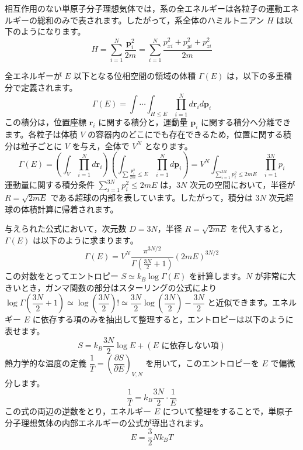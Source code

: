 \solutionheading
\begin{solutionparts}

相互作用のない単原子分子理想気体では，系の全エネルギーは各粒子の運動エネルギーの総和のみで表されます。したがって，系全体のハミルトニアン $H$ は以下のようになります。
\begin{equation*}
H = \sum_{i=1}^N \frac{\boldsymbol{p}_i^2}{2m} = \sum_{i=1}^N \frac{p_{xi}^2 + p_{yi}^2 + p_{zi}^2}{2m}
\end{equation*}

全エネルギーが $E$ 以下となる位相空間の領域の体積 $\Gamma(E)$ は，以下の多重積分で定義されます。
\begin{equation*}
\Gamma(E) = \int \cdots \int_{H \le E} \prod_{i=1}^N d\boldsymbol{r}_i d\boldsymbol{p}_i
\end{equation*}
この積分は，位置座標 $\boldsymbol{r}_i$ に関する積分と，運動量 $\boldsymbol{p}_i$ に関する積分へ分離できます。各粒子は体積 $V$ の容器内のどこにでも存在できるため，位置に関する積分は粒子ごとに $V$ を与え，全体で $V^N$ となります。
\begin{equation*}
\Gamma(E) = \left( \int_V \prod_{i=1}^N d\boldsymbol{r}_i \right) \left( \int_{\sum \frac{\boldsymbol{p}_i^2}{2m} \le E} \prod_{i=1}^N d\boldsymbol{p}_i \right) = V^N \int_{\sum_{i=1}^{3N} p_i^2 \le 2mE} \prod_{i=1}^{3N} p_i
\end{equation*}
運動量に関する積分条件 $\sum_{i=1}^{3N} p_i^2 \le 2mE$ は，$3N$ 次元の空間において，半径が $R = \sqrt{2mE}$ である超球の内部を表しています。したがって，積分は $3N$ 次元超球の体積計算に帰着されます。

与えられた公式において，次元数 $D = 3N$，半径 $R = \sqrt{2mE}$ を代入すると，$\Gamma(E)$ は以下のように求まります。
\begin{equation*}
\Gamma(E) = V^N \frac{\pi^{3N/2}}{\Gamma\left(\frac{3N}{2} + 1\right)} (2mE)^{3N/2}
\end{equation*}
この対数をとってエントロピー $S \simeq k_B \log \Gamma(E)$ を計算します。$N$ が非常に大きいとき，ガンマ関数の部分はスターリングの公式により $\log \Gamma(\dfrac{3N}{2}+1) \simeq \log (\dfrac{3N}{2})! \simeq \dfrac{3N}{2}\log\left(\dfrac{3N}{2}\right) - \dfrac{3N}{2}$ と近似できます。エネルギー $E$ に依存する項のみを抽出して整理すると，エントロピーは以下のように表せます。
\begin{equation*}
S = k_B \frac{3N}{2} \log E + (\text{$E$ に依存しない項})
\end{equation*}
熱力学的な温度の定義 $\dfrac{1}{T} = \left(\dfrac{\partial S}{\partial E}\right)_{V, N}$ を用いて，このエントロピーを $E$ で偏微分します。
\begin{equation*}
\frac{1}{T} = k_B \frac{3N}{2} \cdot \frac{1}{E}
\end{equation*}
この式の両辺の逆数をとり，エネルギー $E$ について整理をすることで，単原子分子理想気体の内部エネルギーの公式が導出されます。
\begin{equation*}
E = \frac{3}{2} N k_B T
\end{equation*}

\end{solutionparts}
